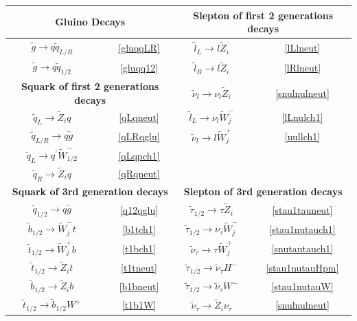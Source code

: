 \documentclass[final,3p,times]{elsarticle}
\begin{document}
\begin{center}
\begin{table}
\centering
\begin{tabular}{|c|c|c|c|} \hline
\multicolumn{2}{|c|}{\bf{Gluino Decays}} &  \multicolumn{2}{c|}{\bf{Slepton of first 2 generations decays}} \\ \hline
$\tilde{g} \rightarrow q \tilde{q}_{L/R}$ &~\ref{gluqqLR} &  $\tilde{l}_L \rightarrow l \tilde{Z}_i$ &~\ref{lLlneut} \\ \hline
$\tilde{g} \rightarrow q \tilde{q}_{1/2}$ &~\ref{gluqq12} & $\tilde{l}_R \rightarrow l \tilde{Z}_i$ &~\ref{lRlneut} \\ \hline
\multicolumn{2}{|c|}{\bf{Squark of first 2 generations decays}} & $\tilde{\nu}_l \rightarrow \nu_l \tilde{Z}_i$ &~\ref{snulnulneut} \\ \hline
$\tilde{q}_L \rightarrow \tilde{Z}_i q$ &~\ref{qLqneut} &  $\tilde{l}_L \rightarrow \nu_l \tilde{W}_{j}^{-}$ &~\ref{lLnulch1} \\ \hline
$\tilde{q}_{L/R} \rightarrow q \tilde{g}$ &~\ref{qLRqglu} & $\tilde{\nu}_l \rightarrow l \tilde{W}_{j}^{+}$ &~\ref{nullch1} \\ \hline
$\tilde{q}_{L} \rightarrow q^{'} \tilde{W}_{1/2}^-$ &~\ref{qLqpch1} & & \\ \hline
$\tilde{q}_R \rightarrow \tilde{Z}_i q$ &~\ref{qRqneut} &  & \\ \hline
\multicolumn{2}{|c|}{\bf{Squark of 3rd generation decays}} & \multicolumn{2}{c|}{\bf{Slepton of 3rd generation decays}} \\ \hline
$\tilde{q}_{1/2} \rightarrow q \tilde{g}$ &~\ref{q12qglu} & $\tilde{\tau}_{1/2} \rightarrow \tau \tilde{Z}_i$ &~\ref{stau1tauneut} \\ \hline
$\tilde{b}_{1/2} \rightarrow \tilde{W}_{j}^- t$ &~\ref{b1tch1} & $\tilde{\tau}_{1/2} \rightarrow \nu_\tau \tilde{W}_{j}^{-}$ &~\ref{stau1nutauch1} \\ \hline
$\tilde{t}_{1/2} \rightarrow \tilde{W}_{j}^+ b$ &~\ref{t1bch1} & $\tilde{\nu}_\tau \rightarrow \tau \tilde{W}_{j}^{+}$ &~\ref{snutautauch1} \\ \hline
$\tilde{t}_{1/2} \rightarrow \tilde{Z}_i t$ &~\ref{t1tneut} & $\tilde{\tau}_{1/2} \rightarrow \tilde{\nu}_\tau H^-$ &~\ref{stau1nutauHpm} \\ \hline
$\tilde{b}_{1/2} \rightarrow \tilde{Z}_i b$ &~\ref{b1bneut} & $\tilde{\tau}_{1/2} \rightarrow \tilde{\nu}_\tau W^-$ &~\ref{stau1nutauW} \\ \hline
$\tilde{t}_{1/2} \rightarrow \tilde{b}_{1/2} W^+$ &~\ref{t1b1W} & $\tilde{\nu}_{\tau} \rightarrow \tilde{Z}_i \nu_{\tau}$ &~\ref{snulnulneut} \\ \hline

\end{tabular}
\end{table}
\end{center}
\end{document}
